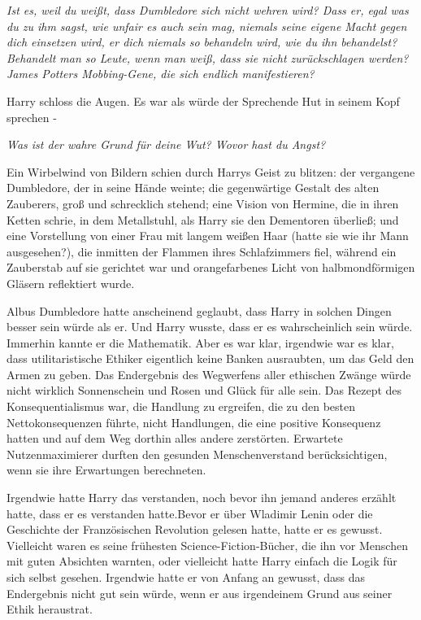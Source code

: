 \emph{Ist es, weil du weißt, dass Dumbledore sich nicht wehren wird? Dass er, egal was du zu ihm sagst, wie unfair es auch sein mag, niemals seine eigene Macht gegen dich einsetzen wird, er dich niemals so behandeln wird, wie du ihn behandelst? Behandelt man so Leute, wenn man weiß, dass sie nicht zurückschlagen werden? James Potters Mobbing-Gene, die sich endlich manifestieren? }

Harry schloss die Augen. Es war als würde der Sprechende Hut in seinem Kopf
sprechen -

\emph{Was ist der wahre Grund für deine Wut? Wovor hast du Angst? }

Ein Wirbelwind von Bildern schien durch Harrys Geist zu blitzen: der vergangene
Dumbledore, der in seine Hände weinte; die gegenwärtige Gestalt des alten
Zauberers, groß und schrecklich stehend; eine Vision von Hermine, die in ihren
Ketten schrie, in dem Metallstuhl, als Harry sie den Dementoren überließ; und
eine Vorstellung von einer Frau mit langem weißen Haar (hatte sie wie ihr Mann
ausgesehen?), die inmitten der Flammen ihres Schlafzimmers fiel, während ein
Zauberstab auf sie gerichtet war und orangefarbenes Licht von halbmondförmigen
Gläsern reflektiert wurde.

Albus Dumbledore hatte anscheinend geglaubt, dass Harry in solchen Dingen besser
sein würde als er. Und Harry wusste, dass er es wahrscheinlich sein würde.
Immerhin kannte er die Mathematik. Aber es war klar, irgendwie war es klar, dass
utilitaristische Ethiker eigentlich keine Banken ausraubten, um das Geld den
Armen zu geben. Das Endergebnis des Wegwerfens aller ethischen Zwänge würde
nicht wirklich Sonnenschein und Rosen und Glück für alle sein. Das Rezept des
Konsequentialismus war, die Handlung zu ergreifen, die zu den besten
Nettokonsequenzen führte, nicht Handlungen, die eine positive Konsequenz hatten
und auf dem Weg dorthin alles andere zerstörten. Erwartete Nutzenmaximierer
durften den gesunden Menschenverstand berücksichtigen, wenn sie ihre Erwartungen
berechneten.

Irgendwie hatte Harry das verstanden, noch bevor ihn jemand anderes erzählt
hatte, dass er es verstanden hatte.Bevor er über Wladimir Lenin oder die
Geschichte der Französischen Revolution gelesen hatte, hatte er es gewusst.
Vielleicht waren es seine frühesten Science-Fiction-Bücher, die ihn vor Menschen
mit guten Absichten warnten, oder vielleicht hatte Harry einfach die Logik für
sich selbst gesehen. Irgendwie hatte er von Anfang an gewusst, dass das
Endergebnis nicht gut sein würde, wenn er aus irgendeinem Grund aus seiner Ethik
heraustrat.


